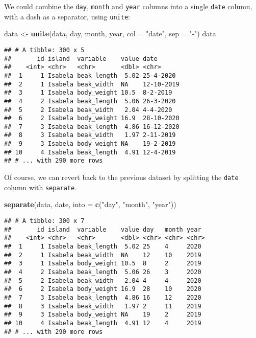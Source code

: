 \documentclass[
]{book}
\newenvironment{Shaded}{}{}
\newcommand{\DataTypeTok}[1]{\textcolor[rgb]{0.56,0.13,0.00}{#1}}
\newcommand{\KeywordTok}[1]{\textcolor[rgb]{0.00,0.44,0.13}{\textbf{#1}}}
\newcommand{\NormalTok}[1]{#1}
\newcommand{\StringTok}[1]{\textcolor[rgb]{0.25,0.44,0.63}{#1}}
\begin{document}
We could combine the \texttt{day}, \texttt{month} and \texttt{year} columns into a single \texttt{date} column, with a dash as a separator, using \texttt{unite}:

\begin{Shaded}
\begin{Highlighting}[]
\NormalTok{data <-}\StringTok{ }\KeywordTok{unite}\NormalTok{(data, day, month, year, }\DataTypeTok{col =} \StringTok{"date"}\NormalTok{, }\DataTypeTok{sep =} \StringTok{"-"}\NormalTok{)}
\NormalTok{data}
\end{Highlighting}
\end{Shaded}

\begin{verbatim}
## # A tibble: 300 x 5
##       id island  variable    value date      
##    <int> <chr>   <chr>       <dbl> <chr>     
##  1     1 Isabela beak_length  5.02 25-4-2020 
##  2     1 Isabela beak_width  NA    12-10-2019
##  3     1 Isabela body_weight 10.5  8-2-2019  
##  4     2 Isabela beak_length  5.06 26-3-2020 
##  5     2 Isabela beak_width   2.04 4-4-2020  
##  6     2 Isabela body_weight 16.9  28-10-2020
##  7     3 Isabela beak_length  4.86 16-12-2020
##  8     3 Isabela beak_width   1.97 2-11-2019 
##  9     3 Isabela body_weight NA    19-2-2019 
## 10     4 Isabela beak_length  4.91 12-4-2019 
## # ... with 290 more rows
\end{verbatim}

Of course, we can revert back to the previous dataset by splitting the \texttt{date} column with \texttt{separate}.

\begin{Shaded}
\begin{Highlighting}[]
\KeywordTok{separate}\NormalTok{(data, date, }\DataTypeTok{into =} \KeywordTok{c}\NormalTok{(}\StringTok{"day"}\NormalTok{, }\StringTok{"month"}\NormalTok{, }\StringTok{"year"}\NormalTok{))}
\end{Highlighting}
\end{Shaded}

\begin{verbatim}
## # A tibble: 300 x 7
##       id island  variable    value day   month year 
##    <int> <chr>   <chr>       <dbl> <chr> <chr> <chr>
##  1     1 Isabela beak_length  5.02 25    4     2020 
##  2     1 Isabela beak_width  NA    12    10    2019 
##  3     1 Isabela body_weight 10.5  8     2     2019 
##  4     2 Isabela beak_length  5.06 26    3     2020 
##  5     2 Isabela beak_width   2.04 4     4     2020 
##  6     2 Isabela body_weight 16.9  28    10    2020 
##  7     3 Isabela beak_length  4.86 16    12    2020 
##  8     3 Isabela beak_width   1.97 2     11    2019 
##  9     3 Isabela body_weight NA    19    2     2019 
## 10     4 Isabela beak_length  4.91 12    4     2019 
## # ... with 290 more rows
\end{verbatim}
\end{document}
